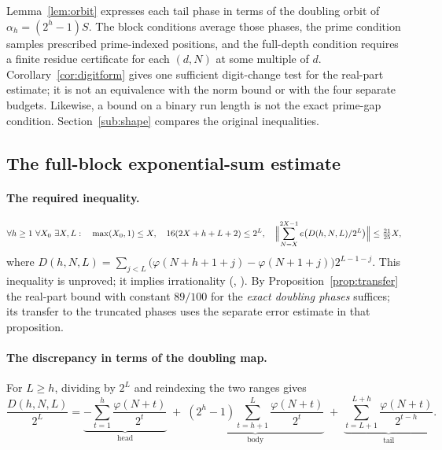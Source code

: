 \begin{obs}\label{obs:allroutes}
Lemma~\ref{lem:orbit} expresses each tail phase in terms of the doubling
orbit of $\alpha_h=(2^h-1)S$. The block conditions average those phases,
the prime condition samples prescribed prime-indexed positions, and the
full-depth condition requires a finite residue certificate for each
$(d,N)$ at some multiple of $d$. Corollary~\ref{cor:digitform} gives one
sufficient digit-change test for the real-part estimate; it is not an
equivalence with the norm bound or with the four separate budgets.
Likewise, a bound on a binary run length is not the exact prime-gap
condition. Section~\ref{sub:shape} compares the original inequalities.
\end{obs}

\subsection{The full-block exponential-sum estimate}

\paragraph{The required inequality.}
\[
  \forall h\ge 1\ \forall X_0\ \exists X,L:\quad
  \max(X_0,1)\le X,\quad 16(2X+h+L+2)\le 2^{L},\quad
  \Bigl\|\sum_{N=X}^{2X-1} e\bigl(D(h,N,L)/2^{L}\bigr)\Bigr\|\le \tfrac{21}{25}X,
\]
where $D(h,N,L)=\sum_{j<L}\bigl(\varphi(N+h+1+j)-\varphi(N+1+j)\bigr)2^{L-1-j}$.
This inequality is unproved; it implies irrationality
(,
).
By Proposition~\ref{prop:transfer} the
real-part bound with constant $89/100$ for the \emph{exact doubling
phases} suffices; its transfer to the truncated phases uses the separate
error estimate in that proposition.

\paragraph{The discrepancy in terms of the doubling map.}
For $L\ge h$, dividing by $2^L$ and reindexing the two ranges gives
\begin{equation}\label{eq:window}
  \frac{D(h,N,L)}{2^{L}}
  =\underbrace{-\sum_{t=1}^{h}\frac{\varphi(N+t)}{2^{t}}}_{\text{head}}
  \;+\;\underbrace{(2^{h}-1)\sum_{t=h+1}^{L}\frac{\varphi(N+t)}{2^{t}}}_{\text{body}}
  \;+\;\underbrace{\sum_{t=L+1}^{L+h}\frac{\varphi(N+t)}{2^{t-h}}}_{\text{tail}} .
\end{equation}


